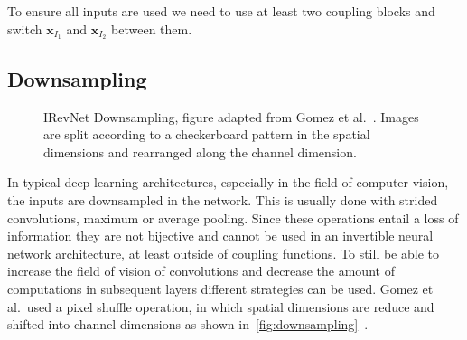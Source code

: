 To ensure all inputs are used we need to use at least two coupling blocks and
switch $\mathbf{x}_{I_1}$ and $\mathbf{x}_{I_2}$ between them.

\subsection{Downsampling}%
\label{sub:downsampling}

\begin{figure}[htpb]
\begin{center}
\end{center}
\caption{IRevNet Downsampling, figure adapted from Gomez et
al.~\citep{gomezReversibleResidualNetwork2017}. Images are split according to a
checkerboard pattern in the spatial dimensions and rearranged along the channel
dimension.}%
\label{fig:downsampling}
\end{figure}

In typical deep learning architectures, especially in the field of computer
vision, the inputs are downsampled in the network. This is usually done with
strided convolutions, maximum or average pooling. Since these operations entail
a loss of information they are not bijective and cannot be used in an
invertible neural network architecture, at least outside of coupling functions.
To still be able to increase the field of vision of convolutions and decrease the
amount of computations in subsequent layers different strategies can be used. Gomez
et al.\ used a pixel shuffle operation, in which spatial dimensions are reduce and
shifted into channel dimensions as shown
in~\autoref{fig:downsampling}~\citep{gomezReversibleResidualNetwork2017}. 

